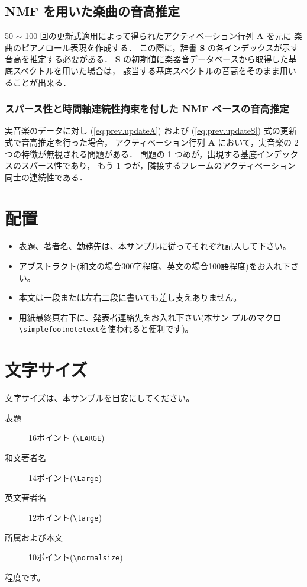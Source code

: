 \documentclass[a4paper,10pt,dvipdfmx,twocolumn]{jsarticle}
\begin{document}
\subsection{NMF を用いた楽曲の音高推定}
50 $\sim$ 100 回の更新式適用によって得られたアクティベーション行列 $\bm{A}$ を元に
楽曲のピアノロール表現を作成する．
この際に，辞書 $\bm{S}$ の各インデックスが示す音高を推定する必要がある．
$\bm{S}$ の初期値に楽器音データベースから取得した基底スペクトルを用いた場合は，
該当する基底スペクトルの音高をそのまま用いることが出来る．

\subsubsection{スパース性と時間軸連続性拘束を付した NMF ベースの音高推定}

実音楽のデータに対し (\ref{eq:prev.updateA}) および (\ref{eq:prev.updateS}) 式の更新式で音高推定を行った場合，
アクティベーション行列 $\bm{A}$ において，実音楽の 2 つの特徴が無視される問題がある．
問題の 1 つめが，出現する基底インデックスのスパース性であり，
もう 1 つが，隣接するフレームのアクティベーション同士の連続性である．


\section{配置}


\begin{itemize}
\item 表題、著者名、勤務先は、本サンプルに従ってそれぞれ記入して下さい。
\item アブストラクト(和文の場合300字程度、英文の場合100語程度)をお入れ下さい。
\item 本文は一段または左右二段に書いても差し支えありません。
\item 用紙最終頁右下に、発表者連絡先をお入れ下さい(本サン
      プルのマクロ\verb|\simplefootnotetext|を使われると便利です)。
\end{itemize}



\section{文字サイズ}
文字サイズは、本サンプルを目安にしてください。
\begin{description}
\item[表題] 16ポイント (\verb|\LARGE|)
\item[和文著者名] 14ポイント(\verb|\Large|)
\item[英文著者名] 12ポイント(\verb|\large|)
\item[所属および本文] 10ポイント(\verb|\normalsize|)
\end{description}
程度です。
\end{document}
